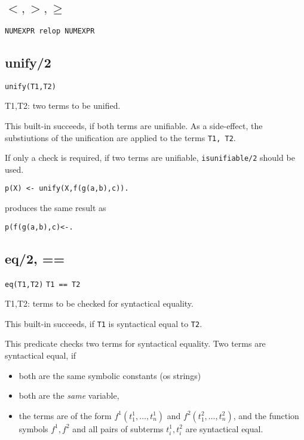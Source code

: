 
\subsection{$<,>,\geq$}

{\tt NUMEXPR relop NUMEXPR}


\subsection{unify/2}

{\tt unify(T1,T2)}

T1,T2: two terms to be unified.

This built-in succeeds, if both terms are unifiable.
As a side-effect, the substiutions of the unification are applied to
the terms {\tt T1, T2}.

If only a check is required, if two terms are unifiable, {\tt isunifiable/2}
should be used.
\begin{verbatim}
p(X) <- unify(X,f(g(a,b),c)).
\end{verbatim}

produces the same result as
\begin{verbatim}
p(f(g(a,b),c)<-.
\end{verbatim}

\subsection{eq/2, ==}

{\tt eq(T1,T2)}
{\tt T1 == T2}

T1,T2: terms to be checked for syntactical equality.

This built-in succeeds, if {\tt T1} is syntactical equal to
{\tt T2}.

This predicate checks two terms for syntactical equality.
Two terms are syntactical equal, if
\begin{itemize}
\item
both are the same symbolic constants (os strings)
\item
both are the {\em same\/} variable,
\item
the terms are of the form
$f^1(t_1^1,\ldots,t_n^1)$ and
$f^2(t_1^2,\ldots,t_n^2)$, and the function symbols $f^1,f^2$ and all
pairs of subterms $t^1_i,t^2_i$ are syntactical equal.
\end{itemize}



